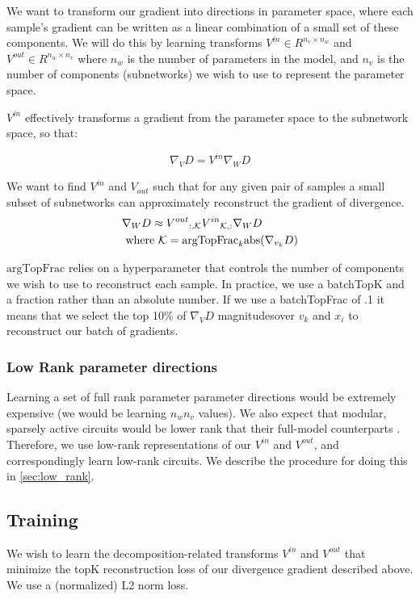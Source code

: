 \documentclass{article}
\theoremstyle{plain}
\theoremstyle{definition}
\theoremstyle{remark}
\begin{document}
We want to transform our gradient into directions in parameter space, where each sample's gradient can be written as a linear combination of a small set of these components. We will do this by learning transforms $V^{in} \in R^{n_v \times n_w}$ and $V^{out} \in R^{n_w \times n_v}$ where $n_w$ is the number of parameters in the model, and $n_v$ is the number of components (subnetworks) we wish to use to represent the parameter space.

$V^{in}$ effectively transforms a gradient from the parameter space to the subnetwork space, so that: 

\begin{equation}
    \nabla_V D = V^{in} \nabla_W D
\end{equation}

We want to find $V^{in}$ and $V_{out}$ such that for any given pair of samples a small subset of subnetworks can approximately reconstruct the gradient of divergence. 
\begin{align}
    & \nabla_W D \approx {V^{out}}_{:, \mathcal{K}} {V^{in}}_{\mathcal{K},:} \nabla_W D \\
    & \text{ where } \mathcal{K}   = \text{argTopFrac}_k \text{abs}(\nabla_{v_k} D) \notag
\end{align}


$\text{argTopFrac}$ relies on a hyperparameter that controls the number of components we wish to use to reconstruct each sample. In practice, we use a batchTopK \cite{bussmann2024batchtopk} and a fraction rather than an absolute number. If we use a batchTopFrac of .1 it means that we select the top 10\% of $\nabla_V D$ magnitudesover $v_k$ and $x_i$ to reconstruct our batch of gradients.

\subsubsection{Low Rank parameter directions}
Learning a set of full rank parameter parameter directions would be extremely expensive (we would be learning $n_w n_v$ values). We also expect that modular, sparsely active circuits would be lower rank that their full-model counterparts \cite{}. Therefore, we use low-rank representations of our $V^{in}$ and $V^{out}$, and correspondingly learn low-rank circuits. We describe the procedure for doing this in \ref{sec:low_rank}. 


\subsection{Training}\label{sec:training}
We wish to learn the decomposition-related transforms $V^{in}$ and $V^{out}$ that minimize the topK reconstruction loss of our divergence gradient described above. We use a (normalized) L2 norm loss.
\end{document}

